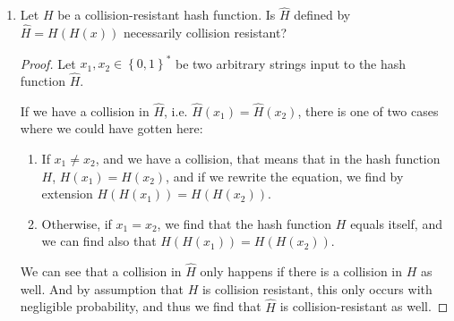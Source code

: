 \documentclass{article}
\DeclareMathOperator{\Mac}{\textsf{Mac}}
\begin{document}
\begin{enumerate}
\begin{enumerate}
\begin{proof}
          With this, the tag for the new message $m'$ is calculated as:

          \begin{align*}
            t' &= F_k(F_k(F_k(0^n \oplus r) \oplus (b_1 \oplus t_r)) \oplus b_2)\\
               &= F_k(F_k(t_r \oplus (b_1 \oplus t_r)) \oplus r_2)\\
               &= F_k(F_k(0^n \oplus b_1) \oplus b_2)\\
            t' &= t
          \end{align*}

          Thus, since we have not explicitly asked the $\Mac$ oracle for the tag
          of $m'$, we find that we have successfully forged a tag for a message
          of length $3n$ from a message of length $2n$. Thus, we have shown that
          this attack is possible.
        \end{proof}
    \end{enumerate}
  \item Let $H$ be a collision-resistant hash function. Is $\hat{H}$ defined by
    $\hat{H} = H(H(x))$ necessarily collision resistant?

    \begin{proof}
      Let $x_1, x_2 \in \left\{0, 1\right\}^{*}$ be two arbitrary strings input
      to the hash function $\hat{H}$.

      If we have a collision in $\hat{H}$, i.e. $\hat{H}(x_1) = \hat{H}(x_2)$,
      there is one of two cases where we could have gotten here:
      \begin{enumerate}
        \item If $x_1 \neq x_2$, and we have a collision, that means that in the
          hash function $H$, $H(x_1) = H(x_2)$, and if we rewrite the equation, 
          we find by extension $H(H(x_1)) = H(H(x_2))$.
        \item Otherwise, if $x_1 = x_2$, we find that the hash function $H$
          equals itself, and we can find also that $H(H(x_1)) = H(H(x_2))$.
      \end{enumerate}

      We can see that a collision in $\hat{H}$ only happens if there is a
      collision in $H$ as well. And by assumption that $H$ is collision
      resistant, this only occurs with negligible probability, and thus we find 
      that $\hat{H}$ is collision-resistant as well.
    \end{proof}


\end{enumerate}
\end{document}
